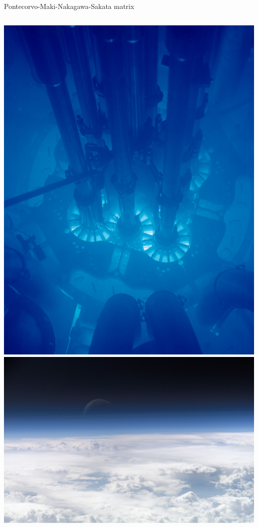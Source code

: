 \documentclass[]{beamer}
\begin{document}
\begin{frame}{Pontecorvo-Maki-Nakagawa-Sakata matrix}
\begin{columns}[c]
		\centering
		\includegraphics[width=\textwidth]{defence/reactor}
		\centering
		\includegraphics[width=\textwidth]{defence/atmosphere}

\end{columns}
\end{frame}
\end{document}
